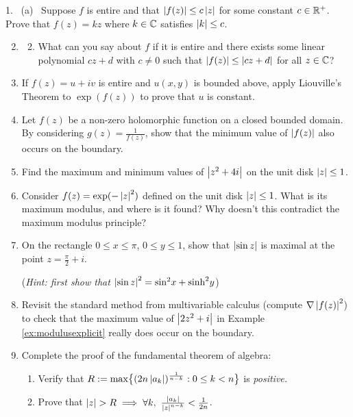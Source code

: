 
\begin{exercises}
	\hangindent\doubleind
	\textup{1.} \ (a) \ Suppose $f$ is entire and that $\left| f(z)\right|\le c\left| z\right|$ for some constant $c\in\mathbb{R}^+$. Prove that $f(z)=kz$ where $k\in\mathbb{C}$ satisfies $\left| k\right|\le c$.
	
	\begin{enumerate}\setcounter{enumi}{1} 
	  \item[]\begin{enumerate}\setcounter{enumii}{1} 
	    \item What can you say about $f$ if it is entire and there exists some linear polynomial $cz+d$ with $c\neq 0$ such that $\left| f(z)\right|\le\left| cz+d\right|$ for all $z\in\mathbb{C}$?
	  \end{enumerate}
	  
	  
	  \item If $f(z)=u+iv$ is entire and $u(x,y)$ is bounded above, apply Liouville's Theorem to $\exp(f(z))$ to prove that $u$ is constant.
	  
	  
	  \item Let $f(z)$ be a non-zero holomorphic function on a closed bounded domain. By considering $g(z)=\frac 1{f(z)}$, show that the minimum value of $\left| f(z)\right|$ also occurs on the boundary.
	  
	  
	  \item Find the maximum and minimum values of $\left| z^2+4i\right|$ on the unit disk $\left| z\right|\le 1$.
	  
	  
	  \item\label{exs:nonholomaxmod} Consider $f(z)=\exp(-\left| z\right|^2)$ defined on the unit disk $\left| z\right|\le 1$. What is its maximum modulus, and where is it found? Why doesn't this contradict the maximum modulus principle?
	  
	  
	  \item On the rectangle $0\le x\le\pi$, $0\le y\le 1$, show that $\left| \sin z\right|$ is maximal at the point $z=\frac\pi 2+i$.\par
	  (\emph{Hint: first show that $\left| \sin z\right|^2=\sin^2\!x+\sinh^2\!y$})
	  
	  
	  \item Revisit the standard method from multivariable calculus (compute $\nabla\left| f(z)\right|^2$) to check that the maximum value of $\left| 2z^2+i\right|$ in Example \ref{ex:modulusexplicit} really does occur on the boundary.
	
	
	  \item\label{exs:fundthmalg} Complete the proof of the fundamental theorem of algebra: 
	  \begin{enumerate}
	    \item Verify that $R:=\max\bigl\{(2n\left| a_k\right|)^{\frac 1{n-k}}:0\le k<n\bigr\}$ is \emph{positive.}
	    \item Prove that $\nm z>R\implies \forall k,\ \frac{\nm{a_k}}{\nm z^{n-k}}<\frac 1{2n}$.
	  \end{enumerate}
	    

\end{enumerate}
\end{exercises}
